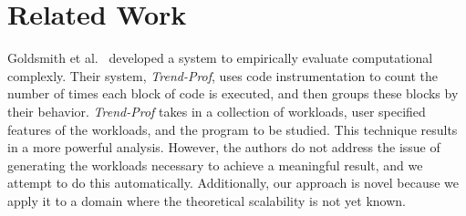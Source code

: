
\section{Related Work}


Goldsmith et al.~\cite{Goldsmith2007} developed a system to empirically evaluate computational complexly.  Their
system, \textit{Trend-Prof}, uses code instrumentation to count the number of times each block of code is executed,
and then groups these blocks by their behavior.  \textit{Trend-Prof} takes in a collection of workloads, user
specified features of the workloads, and the program to be studied. This technique results in a more powerful
analysis. However, the authors do not address the issue of generating the workloads necessary to achieve a meaningful
result, and we attempt to do this automatically.  Additionally, our approach is novel because we apply it to a domain
where the theoretical scalability is not yet known.
